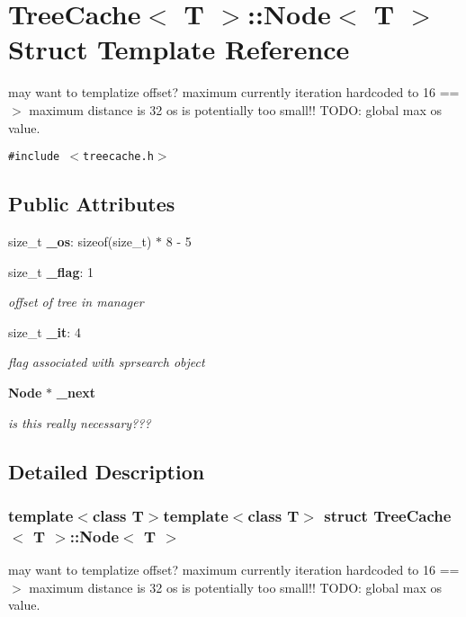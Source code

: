 \section{Tree\-Cache$<$ T $>$::Node$<$ T $>$ Struct Template Reference}
\label{structTreeCache_1_1Node}
may want to templatize offset? maximum currently iteration hardcoded to 16 ==$>$ maximum distance is 32 os is potentially too small!! TODO: global max os value.  


{\tt \#include $<$treecache.h$>$}

\subsection*{Public Attributes}
\begin{CompactItemize}
\item 
size\_\-t {\bf \_\-os}: sizeof(size\_\-t) $\ast$ 8 - 5
\item 
size\_\-t {\bf \_\-flag}: 1
\begin{CompactList}\small\item\em offset of tree in manager \item\end{CompactList}\item 
size\_\-t {\bf \_\-it}: 4
\begin{CompactList}\small\item\em flag associated with sprsearch object \item\end{CompactList}\item 
{\bf Node} $\ast$ {\bf \_\-next}
\begin{CompactList}\small\item\em is this really necessary??? \item\end{CompactList}\end{CompactItemize}


\subsection{Detailed Description}
\subsubsection*{template$<$class T$>$template$<$class T$>$ struct Tree\-Cache$<$ T $>$::Node$<$ T $>$}

may want to templatize offset? maximum currently iteration hardcoded to 16 ==$>$ maximum distance is 32 os is potentially too small!! TODO: global max os value. 

